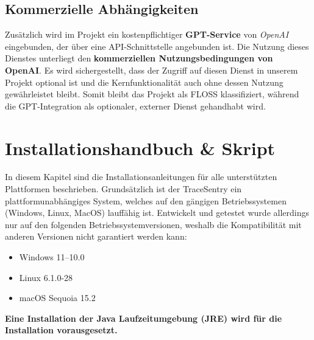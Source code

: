 \documentclass[a4paper,12pt]{report}
\begin{document}
    \subsection{Kommerzielle Abhängigkeiten}
    Zusätzlich wird im Projekt ein kostenpflichtiger \textbf{GPT-Service} von \textit{OpenAI} eingebunden, der über eine API-Schnittstelle angebunden ist.
    Die Nutzung dieses Dienstes unterliegt den \textbf{kommerziellen Nutzungsbedingungen von OpenAI}.
    Es wird sichergestellt, dass der Zugriff auf diesen Dienst in unserem Projekt optional ist und die Kernfunktionalität auch ohne dessen Nutzung gewährleistet bleibt.
    Somit bleibt das Projekt als FLOSS klassifiziert, während die GPT-Integration als optionaler, externer Dienst gehandhabt wird.

    \clearpage


    \section{Installationshandbuch \& Skript}
    In diesem Kapitel sind die Installationsanleitungen für alle unterstützten Plattformen beschrieben.
    Grundsätzlich ist der TraceSentry ein plattformunabhängiges System, welches auf den gängigen Betriebssystemen (Windows, Linux, MacOS) lauffähig ist.
    Entwickelt und getestet wurde allerdings nur auf den folgenden Betriebssystemversionen, weshalb die Kompatibilität mit anderen Versionen nicht garantiert werden kann:
    \begin{itemize}
        \item Windows 11--10.0
        \item Linux 6.1.0-28
        \item macOS Sequoia 15.2
    \end{itemize}

    \textbf{Eine Installation der Java Laufzeitumgebung (JRE) wird für die Installation vorausgesetzt.}
\end{document}
